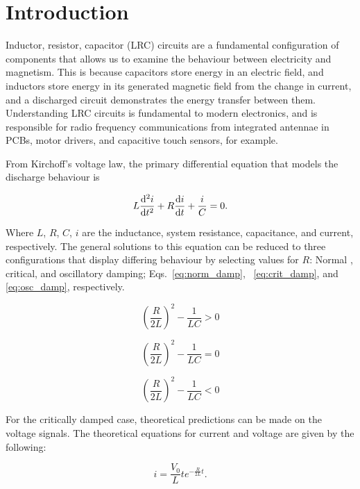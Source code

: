 \section{Introduction}

Inductor, resistor, capacitor (LRC) circuits are a fundamental configuration of components that allows us to examine
the behaviour between electricity and magnetism.
This is because capacitors store energy in an electric field, and inductors store energy in its generated magnetic
field from the change in current, and a discharged circuit demonstrates the energy transfer between them.
Understanding LRC circuits is fundamental to modern electronics, and is responsible for radio
frequency communications from integrated
antennae in PCBs, motor drivers, and capacitive touch sensors, for example.

From Kirchoff's voltage law, the primary differential equation that models the discharge behaviour is

\begin{equation}\label{eq:diffyq}
L \odv[2]{i}{t} + R \odv{i}{t} + \frac{i}{C} = 0.
\end{equation}

Where $L$, $R$, $C$, $i$ are the inductance, system resistance, capacitance, and current, respectively.
The general solutions to this equation can be reduced to three configurations that display differing behaviour by
selecting
values for
$R$:
Normal ,
critical, and
oscillatory
damping; Eqs.~\eqref{eq:norm_damp}, ~\eqref{eq:crit_damp}, and \eqref{eq:osc_damp}, respectively.

\begin{equation}\label{eq:norm_damp}
\left( \frac{R}{2 L}\right)^2 - \frac{1}{L C} > 0
\end{equation}

\begin{equation}\label{eq:crit_damp}
\left( \frac{R}{2 L}\right)^2 - \frac{1}{L C} = 0
\end{equation}

\begin{equation}\label{eq:osc_damp}
\left( \frac{R}{2 L}\right)^2 - \frac{1}{L C} < 0
\end{equation}

For the critically damped case, theoretical predictions can be made on the voltage signals.
The theoretical equations for current and voltage are given by the following:

\begin{equation}
i = \frac{V_0}{L} t e^{- \frac{R}{2 L}t}.\label{eq:i_theo}
\end{equation}

